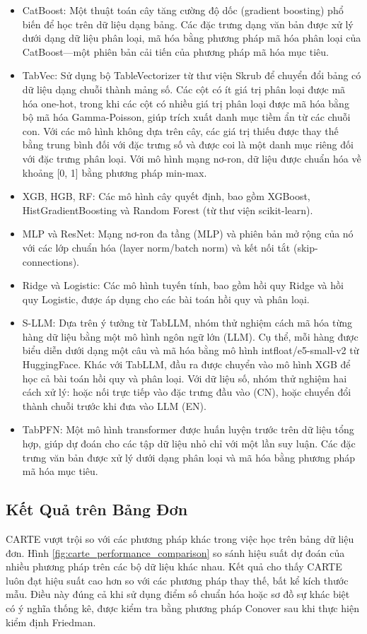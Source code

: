 \documentclass{article}
\begin{document}
\begin{itemize}
    \item CatBoost: Một thuật toán cây tăng cường độ dốc (gradient boosting) phổ biến để học trên dữ liệu dạng bảng. Các đặc trưng dạng văn bản được xử lý dưới dạng dữ liệu phân loại, mã hóa bằng phương pháp mã hóa phân loại của CatBoost—một phiên bản cải tiến của phương pháp mã hóa mục tiêu.
    \item TabVec: Sử dụng bộ TableVectorizer từ thư viện Skrub để chuyển đổi bảng có dữ liệu dạng chuỗi thành mảng số. Các cột có ít giá trị phân loại được mã hóa one-hot, trong khi các cột có nhiều giá trị phân loại được mã hóa bằng bộ mã hóa Gamma-Poisson, giúp trích xuất danh mục tiềm ẩn từ các chuỗi con. Với các mô hình không dựa trên cây, các giá trị thiếu được thay thế bằng trung bình đối với đặc trưng số và được coi là một danh mục riêng đối với đặc trưng phân loại. Với mô hình mạng nơ-ron, dữ liệu được chuẩn hóa về khoảng [0, 1] bằng phương pháp min-max.
    \item XGB, HGB, RF: Các mô hình cây quyết định, bao gồm XGBoost, HistGradientBoosting và Random Forest (từ thư viện scikit-learn).
    \item MLP và ResNet: Mạng nơ-ron đa tầng (MLP) và phiên bản mở rộng của nó với các lớp chuẩn hóa (layer norm/batch norm) và kết nối tắt (skip-connections).
    \item Ridge và Logistic: Các mô hình tuyến tính, bao gồm hồi quy Ridge và hồi quy Logistic, được áp dụng cho các bài toán hồi quy và phân loại.
    \item S-LLM: Dựa trên ý tưởng từ TabLLM, nhóm thử nghiệm cách mã hóa từng hàng dữ liệu bằng một mô hình ngôn ngữ lớn (LLM). Cụ thể, mỗi hàng được biểu diễn dưới dạng một câu và mã hóa bằng mô hình intfloat/e5-small-v2 từ HuggingFace. Khác với TabLLM, đầu ra được chuyển vào mô hình XGB để học cả bài toán hồi quy và phân loại. Với dữ liệu số, nhóm thử nghiệm hai cách xử lý: hoặc nối trực tiếp vào đặc trưng đầu vào (CN), hoặc chuyển đổi thành chuỗi trước khi đưa vào LLM (EN).
    \item TabPFN: Một mô hình transformer được huấn luyện trước trên dữ liệu tổng hợp, giúp dự đoán cho các tập dữ liệu nhỏ chỉ với một lần suy luận. Các đặc trưng văn bản được xử lý dưới dạng phân loại và mã hóa bằng phương pháp mã hóa mục tiêu.
\end{itemize}


\subsection{Kết Quả trên Bảng Đơn}
CARTE vượt trội so với các phương pháp khác trong việc học trên bảng dữ liệu đơn. Hình \ref{fig:carte_performance_comparison} so sánh hiệu suất dự đoán của nhiều phương pháp trên các bộ dữ liệu khác nhau. Kết quả cho thấy CARTE luôn đạt hiệu suất cao hơn so với các phương pháp thay thế, bất kể kích thước mẫu. Điều này đúng cả khi sử dụng điểm số chuẩn hóa hoặc sơ đồ sự khác biệt có ý nghĩa thống kê, được kiểm tra bằng phương pháp Conover sau khi thực hiện kiểm định Friedman.
\end{document}
